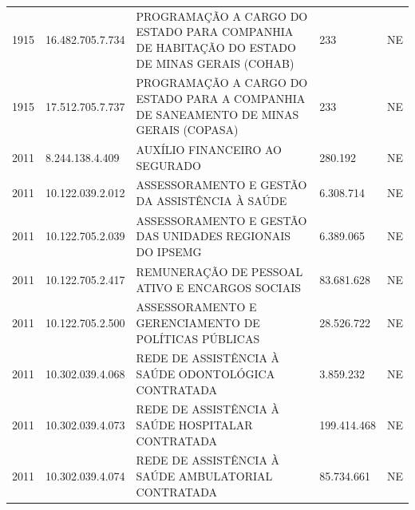 \documentclass{article}
\begin{document}
\begin{longtable}[c]{m{1cm}|m{2cm}|m{10cm}|m{2cm}|m{1cm}}
\multicolumn{1}{C{1cm}|}{1915} & \multicolumn{1}{C{2cm}|}{16.482.705.7.734} & \multicolumn{1}{L{10cm}|}{PROGRAMAÇÃO A CARGO DO ESTADO PARA COMPANHIA DE HABITAÇÃO DO ESTADO DE MINAS GERAIS (COHAB)} & \multicolumn{1}{R{2cm}|}{233} & \multicolumn{1}{C{1cm}}{NE} \\
\multicolumn{1}{C{1cm}|}{1915} & \multicolumn{1}{C{2cm}|}{17.512.705.7.737} & \multicolumn{1}{L{10cm}|}{PROGRAMAÇÃO A CARGO DO ESTADO PARA A COMPANHIA DE SANEAMENTO DE MINAS GERAIS (COPASA)} & \multicolumn{1}{R{2cm}|}{233} & \multicolumn{1}{C{1cm}}{NE} \\
\multicolumn{1}{C{1cm}|}{2011} & \multicolumn{1}{C{2cm}|}{8.244.138.4.409} & \multicolumn{1}{L{10cm}|}{AUXÍLIO FINANCEIRO AO SEGURADO} & \multicolumn{1}{R{2cm}|}{280.192} & \multicolumn{1}{C{1cm}}{NE} \\
\multicolumn{1}{C{1cm}|}{2011} & \multicolumn{1}{C{2cm}|}{10.122.039.2.012} & \multicolumn{1}{L{10cm}|}{ASSESSORAMENTO E GESTÃO DA ASSISTÊNCIA À SAÚDE} & \multicolumn{1}{R{2cm}|}{6.308.714} & \multicolumn{1}{C{1cm}}{NE} \\
\multicolumn{1}{C{1cm}|}{2011} & \multicolumn{1}{C{2cm}|}{10.122.705.2.039} & \multicolumn{1}{L{10cm}|}{ASSESSORAMENTO E GESTÃO DAS UNIDADES REGIONAIS DO IPSEMG} & \multicolumn{1}{R{2cm}|}{6.389.065} & \multicolumn{1}{C{1cm}}{NE} \\
\multicolumn{1}{C{1cm}|}{2011} & \multicolumn{1}{C{2cm}|}{10.122.705.2.417} & \multicolumn{1}{L{10cm}|}{REMUNERAÇÃO DE PESSOAL ATIVO E ENCARGOS SOCIAIS} & \multicolumn{1}{R{2cm}|}{83.681.628} & \multicolumn{1}{C{1cm}}{NE} \\
\multicolumn{1}{C{1cm}|}{2011} & \multicolumn{1}{C{2cm}|}{10.122.705.2.500} & \multicolumn{1}{L{10cm}|}{ASSESSORAMENTO E GERENCIAMENTO DE POLÍTICAS PÚBLICAS} & \multicolumn{1}{R{2cm}|}{28.526.722} & \multicolumn{1}{C{1cm}}{NE} \\
\multicolumn{1}{C{1cm}|}{2011} & \multicolumn{1}{C{2cm}|}{10.302.039.4.068} & \multicolumn{1}{L{10cm}|}{REDE DE ASSISTÊNCIA À SAÚDE ODONTOLÓGICA CONTRATADA} & \multicolumn{1}{R{2cm}|}{3.859.232} & \multicolumn{1}{C{1cm}}{NE} \\
\multicolumn{1}{C{1cm}|}{2011} & \multicolumn{1}{C{2cm}|}{10.302.039.4.073} & \multicolumn{1}{L{10cm}|}{REDE DE ASSISTÊNCIA À SAÚDE HOSPITALAR CONTRATADA} & \multicolumn{1}{R{2cm}|}{199.414.468} & \multicolumn{1}{C{1cm}}{NE} \\
\multicolumn{1}{C{1cm}|}{2011} & \multicolumn{1}{C{2cm}|}{10.302.039.4.074} & \multicolumn{1}{L{10cm}|}{REDE DE ASSISTÊNCIA À SAÚDE AMBULATORIAL CONTRATADA} & \multicolumn{1}{R{2cm}|}{85.734.661} & \multicolumn{1}{C{1cm}}{NE} \\

\end{longtable}
\end{document}
